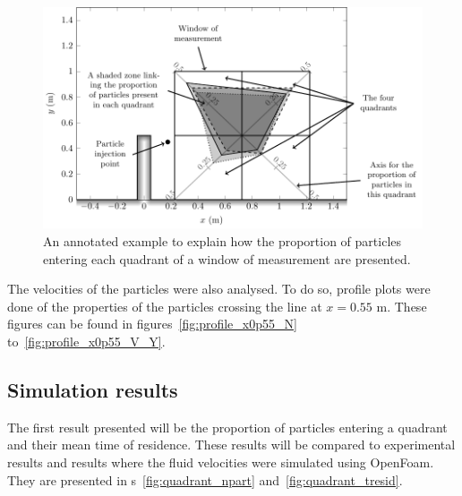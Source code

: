 \begin{figure}[H]%
\begin{center}
%
  \includegraphics[]{./Figures/CanalAlgAnnotatedFigure}
%
\end{center}
\caption
{An annotated example to explain how the proportion of particles entering each quadrant of a window of measurement are presented.}
\label{fig:expe_canal_annotated_example}
\end{figure}

The velocities of the particles were also analysed. To do so, profile plots were done of the properties of the particles crossing the
line at $x=0.55$ m. These figures can be found in figures~\ref{fig:profile_x0p55_N} to~\ref{fig:profile_x0p55_V_Y}.

\subsection{Simulation results}

The first result presented will be the proportion of particles entering a quadrant and their mean time of residence. These results
will be compared to experimental results and results where the fluid velocities were simulated using OpenFoam. They are presented in
\figurename{}s~\ref{fig:quadrant_npart} and~\ref{fig:quadrant_tresid}.

